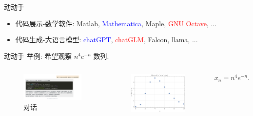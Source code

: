 \documentclass[
10pt, 
aspectratio=43, 
]{beamer}
\begin{document}
\begin{frame}{动动手}

\begin{itemize}
        \item 代码展示-数学软件: Matlab, \textcolor{blue}{Mathematica}, Maple, \textcolor{red}{GNU Octave},  ...\\
        
        \item 代码生成-大语言模型: \textcolor{blue}{chatGPT},  \textcolor{red}{chatGLM},  Falcon, llama,  ... 
\end{itemize}

\end{frame}

\begin{frame}{动动手}
举例: 希望观察 $n^4 e^{-n}$ 数列. 
\begin{columns}
\begin{figure}
    \centering
    \includegraphics[width=1.2\linewidth]{Chat酱-1696676606183.png}
    \caption{对话}

\end{figure}
	\small
        \begin{figure}
            \centering
            \includegraphics[width=0.8\linewidth]{n^4 Exp[-n].png}
        
        \end{figure}
        \begin{equation}
        x_n = n^4 e^{-n}.
        \end{equation}
\end{columns}
\end{frame}
\end{document}
